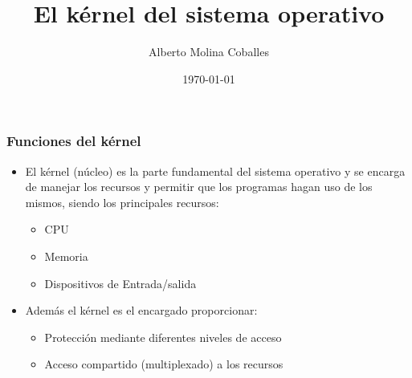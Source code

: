 \documentclass{beamer}
\author{Alberto Molina Coballes}
\title{El kérnel del sistema operativo}
\institute{IES Gonzalo Nazareno}
\date{\today}
\begin{document}
\begin{frame}[t,plain]
\titlepage
\end{frame}

\begin{frame} \frametitle{Funciones del kérnel}
  \begin{itemize}
  \item El kérnel (núcleo) es la parte fundamental del sistema
    operativo y se encarga de manejar los recursos y permitir que los
    programas hagan uso de los mismos, siendo los principales recursos:
    \begin{itemize}
    \item CPU
    \item Memoria
    \item Dispositivos de Entrada/salida
    \end{itemize}
  \item Además el kérnel es el encargado proporcionar:
    \begin{itemize}
    \item Protección mediante diferentes niveles de acceso
    \item Acceso compartido (multiplexado) a los recursos
    \end{itemize}
  \end{itemize}
\end{frame}
\end{document}
